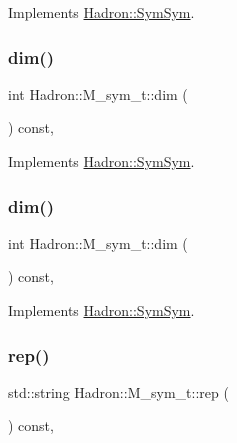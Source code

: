 Implements \mbox{\hyperlink{structHadron_1_1SymSym_ae57780f41b9f6c03c6056eed3677bd48}{Hadron\+::\+Sym\+Sym}}.

\mbox{\label{structHadron_1_1M__sym__t_a9ee8ba6fd6c2220231052690b2995ed5}} 
\subsubsection{\texorpdfstring{dim()}{dim()}\hspace{0.1cm}{\footnotesize\ttfamily [2/3]}}
{\footnotesize\ttfamily int Hadron\+::\+M\+\_\+sym\+\_\+t\+::dim (\begin{DoxyParamCaption}{ }\end{DoxyParamCaption}) const\hspace{0.3cm}{\ttfamily [inline]}, {\ttfamily [virtual]}}



Implements \mbox{\hyperlink{structHadron_1_1SymSym_ae57780f41b9f6c03c6056eed3677bd48}{Hadron\+::\+Sym\+Sym}}.

\mbox{\label{structHadron_1_1M__sym__t_a9ee8ba6fd6c2220231052690b2995ed5}} 
\subsubsection{\texorpdfstring{dim()}{dim()}\hspace{0.1cm}{\footnotesize\ttfamily [3/3]}}
{\footnotesize\ttfamily int Hadron\+::\+M\+\_\+sym\+\_\+t\+::dim (\begin{DoxyParamCaption}{ }\end{DoxyParamCaption}) const\hspace{0.3cm}{\ttfamily [inline]}, {\ttfamily [virtual]}}



Implements \mbox{\hyperlink{structHadron_1_1SymSym_ae57780f41b9f6c03c6056eed3677bd48}{Hadron\+::\+Sym\+Sym}}.

\mbox{\label{structHadron_1_1M__sym__t_ad90bc816709bb65ec3e0b804090fbefe}} 
\subsubsection{\texorpdfstring{rep()}{rep()}\hspace{0.1cm}{\footnotesize\ttfamily [1/3]}}
{\footnotesize\ttfamily std\+::string Hadron\+::\+M\+\_\+sym\+\_\+t\+::rep (\begin{DoxyParamCaption}{ }\end{DoxyParamCaption}) const\hspace{0.3cm}{\ttfamily [inline]}, {\ttfamily [virtual]}}



